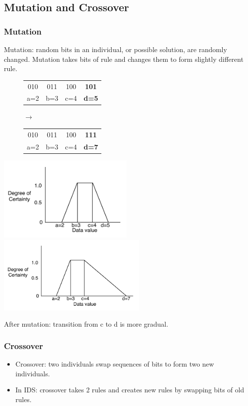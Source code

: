 \documentclass{beamer}
\begin{document}
\subsection{Mutation and Crossover}
\begin{frame}
  \frametitle{Mutation}
Mutation: random bits in an individual, or possible solution, are randomly changed. Mutation takes bits of rule and changes them to form slightly different rule.

\begin{figure}
\begin{small}
	\begin{tabular}{|cccc|} \hline
	010 & 011 & 100 & \textbf{101}\\
	a=2 & b=3 & c=4 & \textbf{d=5}\\
	\hline\end{tabular}
	$\rightarrow$
	\quad
	\begin{tabular}{|cccc|} \hline
	010 & 011 & 100 & \textbf{111}\\
	a=2 & b=3 & c=4 & \textbf{d=7}\\
	\hline\end{tabular}
\end{small}
\end{figure}

	\includegraphics[width=0.50\textwidth]{../Talk/MutCrossTrapezoids/mut2345.pdf}
	\includegraphics[width=0.55\textwidth]{../Talk/MutCrossTrapezoids/mut2347.pdf}
	
After mutation: transition from c to d is more gradual.
\end{frame}


\begin{frame}
  \frametitle{Crossover}
  \begin{itemize}
  	\item Crossover: two individuals swap sequences of bits to form two new individuals.
  	\item In IDS: crossover takes 2 rules and creates new rules by swapping bits of old rules.
  \end{itemize}
\end{frame}
\end{document}
